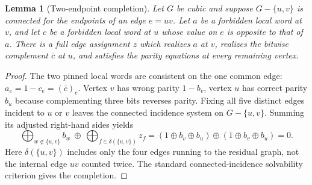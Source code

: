 \documentclass[11pt]{article}
\newtheorem{lemma}[theorem]{Lemma}
\begin{document}
\begin{lemma}[Two-endpoint completion]\label{lem:two}
Let $G$ be cubic and suppose $G-\{u,v\}$ is connected for the endpoints of an edge $e=uv$. Let $a$ be a forbidden local word at $v$, and let $c$ be a forbidden local word at $u$ whose value on $e$ is \emph{opposite} to that of $a$. There is a full edge assignment $z$ which realizes $a$ at $v$, realizes the \emph{bitwise complement} $\bar c$ at $u$, and satisfies the parity equations at every remaining vertex.
\end{lemma}
\begin{proof}
The two pinned local words are consistent on the one common edge: $a_e=1-c_e=(\bar c)_e$. Vertex $v$ has wrong parity $1-b_v$, vertex $u$ has correct parity $b_u$ because complementing three bits reverses parity. Fixing all five distinct edges incident to $u$ or $v$ leaves the connected incidence system on $G-\{u,v\}$. Summing its adjusted right-hand sides yields
\[
\bigoplus_{w\notin\{u,v\}}b_w\ \oplus\ \bigoplus_{f\in\delta(\{u,v\})}z_f
=(1\oplus b_v\oplus b_u)\oplus(1\oplus b_v\oplus b_u)=0.
\]
Here $\delta(\{u,v\})$ includes only the four edges running to the residual graph, not the internal edge $uv$ counted twice. The standard connected-incidence solvability criterion gives the completion.\end{proof}
\end{document}
